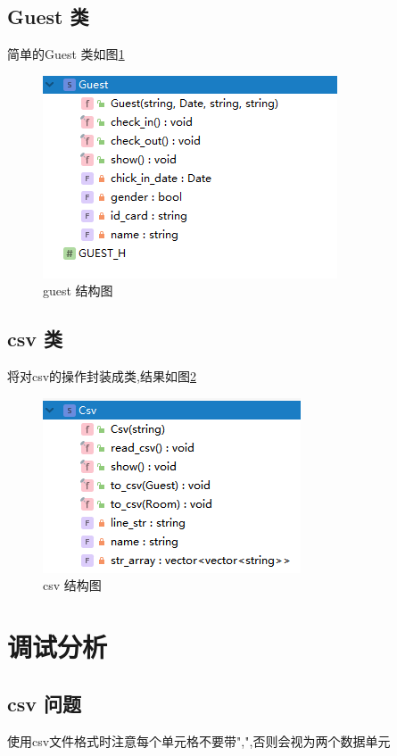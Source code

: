 \documentclass[UTF8]{ctexart}
\begin{document}
  \subsection{Guest 类}
    简单的Guest 类如图\ref{fig:structure_guest}
    \begin{figure}[H]
        \centering
        \includegraphics[scale = 1]{structure_guest}
        \caption{guest 结构图}
        \label{fig:structure_guest}
      \end{figure}

  \subsection{csv 类}
    将对csv的操作封装成类,结果如图\ref{fig:structure_csv}
    \begin{figure}[H]
        \centering
        \includegraphics[scale = 1]{structure_csv}
        \caption{csv 结构图}
        \label{fig:structure_csv}
      \end{figure}

\section{调试分析}
  \subsection{csv 问题}
    使用csv文件格式时注意每个单元格不要带",",否则会视为两个数据单元
\end{document}
